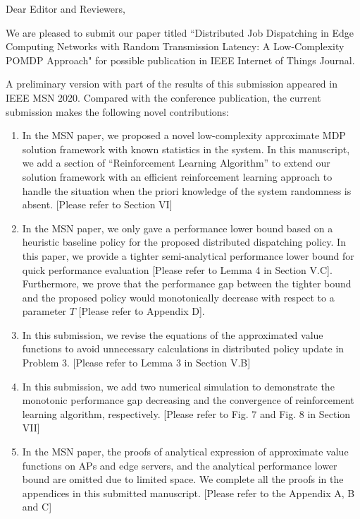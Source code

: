 \documentclass[10pt,draftclsnofoot,onecolumn]{article}
\begin{document}
Dear Editor and Reviewers,

We are pleased to submit our paper titled ``Distributed Job Dispatching in Edge Computing Networks with Random Transmission Latency: A Low-Complexity POMDP Approach" for possible publication in IEEE Internet of Things Journal.

A preliminary version with part of the results of this submission appeared in IEEE MSN 2020.
Compared with the conference publication, the current submission makes the following novel contributions:
\begin{enumerate}
\item In the MSN paper, we proposed a novel low-complexity approximate MDP solution framework with known statistics in the system.
In this manuscript, we add a section of ``Reinforcement Learning Algorithm'' to extend our solution framework with an efficient reinforcement learning approach to handle the situation when the priori knowledge of the system randomness is absent. [Please refer to Section VI]

\item In the MSN paper, we only gave a performance lower bound based on a heuristic baseline policy for the proposed distributed dispatching policy. In this paper, we provide a tighter semi-analytical performance lower bound for quick performance evaluation [Please refer to Lemma 4 in Section V.C]. 
Furthermore, we prove that the performance gap between the tighter bound and the proposed policy would monotonically decrease with respect to a parameter $T$ [Please refer to Appendix D]. 

\item In this submission, we revise the equations of the approximated value functions to avoid unnecessary calculations in distributed policy update in Problem 3. [Please refer to Lemma 3 in Section V.B]

\item In this submission, we add two numerical simulation to demonstrate the monotonic performance gap decreasing and the convergence of reinforcement learning algorithm, respectively. [Please refer to Fig. 7 and Fig. 8 in Section VII]

\item In the MSN paper, the proofs of analytical expression of approximate value functions on APs and edge servers, and the analytical performance lower bound are omitted due to limited space. We complete all the proofs in the appendices in this submitted manuscript. [Please refer to the Appendix A, B and C]


\end{enumerate}
\end{document}

